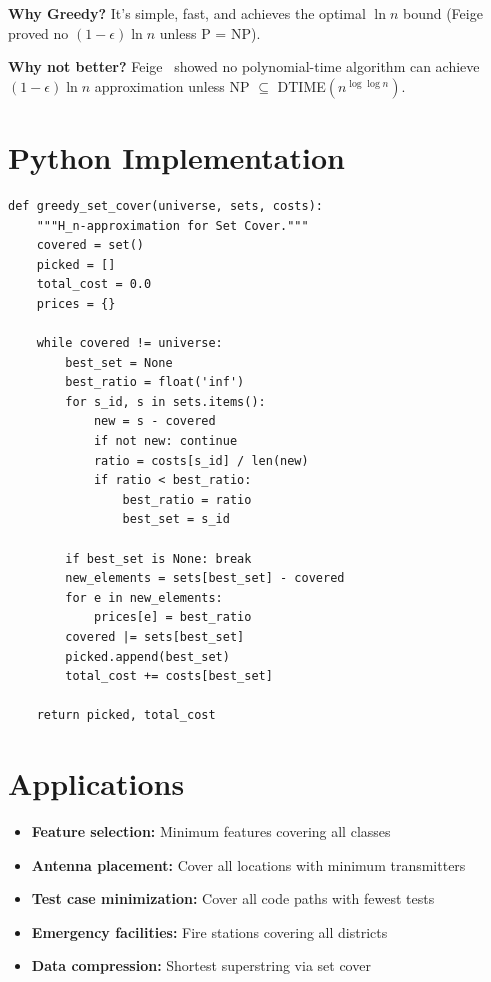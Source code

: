 \textbf{Why Greedy?} It's simple, fast, and achieves the optimal $\ln n$ bound (Feige~\cite{feige98} proved no $(1-\epsilon)\ln n$ unless P = NP).

\textbf{Why not better?} Feige~\cite{feige98} showed no polynomial-time algorithm can achieve $(1-\epsilon)\ln n$ approximation unless NP $\subseteq$ DTIME$(n^{\log\log n})$.

\section{Python Implementation}

\begin{lstlisting}[style=python, caption=Greedy Set Cover]
def greedy_set_cover(universe, sets, costs):
    """H_n-approximation for Set Cover."""
    covered = set()
    picked = []
    total_cost = 0.0
    prices = {}
    
    while covered != universe:
        best_set = None
        best_ratio = float('inf')
        for s_id, s in sets.items():
            new = s - covered
            if not new: continue
            ratio = costs[s_id] / len(new)
            if ratio < best_ratio:
                best_ratio = ratio
                best_set = s_id
        
        if best_set is None: break
        new_elements = sets[best_set] - covered
        for e in new_elements:
            prices[e] = best_ratio
        covered |= sets[best_set]
        picked.append(best_set)
        total_cost += costs[best_set]
    
    return picked, total_cost
\end{lstlisting}

\section{Applications}
\begin{itemize}
    \item \textbf{Feature selection:} Minimum features covering all classes
    \item \textbf{Antenna placement:} Cover all locations with minimum transmitters
    \item \textbf{Test case minimization:} Cover all code paths with fewest tests
    \item \textbf{Emergency facilities:} Fire stations covering all districts
    \item \textbf{Data compression:} Shortest superstring via set cover
\end{itemize}

